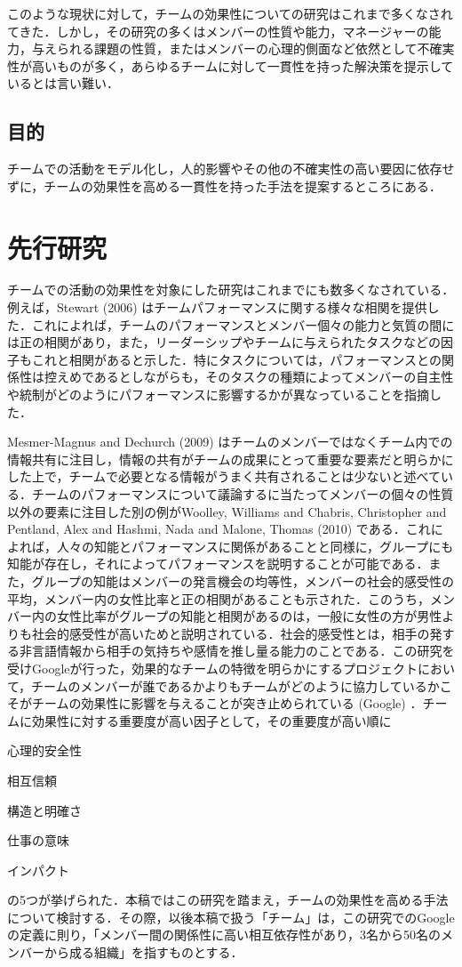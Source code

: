 \documentclass[a4paper, 11pt]{jsarticle}
\begin{document}
このような現状に対して，チームの効果性についての研究はこれまで多くなされてきた．しかし，その研究の多くはメンバーの性質や能力，マネージャーの能力，与えられる課題の性質，またはメンバーの心理的側面など依然として不確実性が高いものが多く，あらゆるチームに対して一貫性を持った解決策を提示しているとは言い難い．
\subsection{目的}
チームでの活動をモデル化し，人的影響やその他の不確実性の高い要因に依存せずに，チームの効果性を高める一貫性を持った手法を提案するところにある．

\section{先行研究}
チームでの活動の効果性を対象にした研究はこれまでにも数多くなされている．例えば，Stewart (2006) \cite{Stewart}はチームパフォーマンスに関する様々な相関を提供した．これによれば，チームのパフォーマンスとメンバー個々の能力と気質の間には正の相関があり，また，リーダーシップやチームに与えられたタスクなどの因子もこれと相関があると示した．特にタスクについては，パフォーマンスとの関係性は控えめであるとしながらも，そのタスクの種類によってメンバーの自主性や統制がどのようにパフォーマンスに影響するかが異なっていることを指摘した．

Mesmer-Magnus and Dechurch (2009) \cite{Mesmer}はチームのメンバーではなくチーム内での情報共有に注目し，情報の共有がチームの成果にとって重要な要素だと明らかにした上で，チームで必要となる情報がうまく共有されることは少ないと述べている．チームのパフォーマンスについて議論するに当たってメンバーの個々の性質以外の要素に注目した別の例がWoolley, Williams and Chabris, Christopher and Pentland, Alex and Hashmi, Nada and Malone, Thomas (2010) \cite{Woolley}である．これによれば，人々の知能とパフォーマンスに関係があることと同様に，グループにも知能が存在し，それによってパフォーマンスを説明することが可能である．また，グループの知能はメンバーの発言機会の均等性，メンバーの社会的感受性の平均，メンバー内の女性比率と正の相関があることも示された．このうち，メンバー内の女性比率がグループの知能と相関があるのは，一般に女性の方が男性よりも社会的感受性が高いためと説明されている．社会的感受性とは，相手の発する非言語情報から相手の気持ちや感情を推し量る能力のことである．この研究を受けGoogleが行った，効果的なチームの特徴を明らかにするプロジェクトにおいて，チームのメンバーが誰であるかよりもチームがどのように協力しているかこそがチームの効果性に影響を与えることが突き止められている (Google\cite{Google}) ．チームに効果性に対する重要度が高い因子として，その重要度が高い順に
\begin{inparaenum}[1)]
  \item 心理的安全性
  \item 相互信頼
  \item 構造と明確さ
  \item 仕事の意味
  \item インパクト
\end{inparaenum}
の5つが挙げられた．本稿ではこの研究を踏まえ，チームの効果性を高める手法について検討する．その際，以後本稿で扱う「チーム」は，この研究でのGoogleの定義に則り，「メンバー間の関係性に高い相互依存性があり，3名から50名のメンバーから成る組織」を指すものとする．
\end{document}
